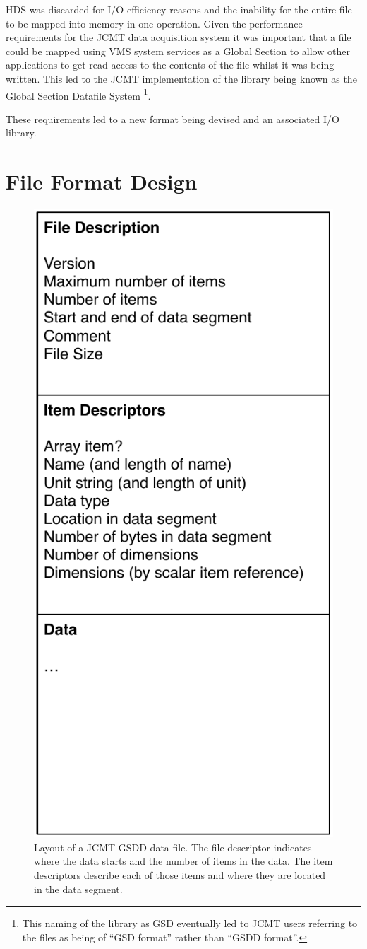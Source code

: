 \documentclass[final,authoryear,5p,times,twocolumn]{elsarticle}
\begin{document}
HDS was discarded for I/O efficiency reasons and the inability for the
entire file to be mapped into memory in one operation. Given the
performance requirements for the JCMT data acquisition system it was
important that a file could be mapped using VMS system services as a
Global Section to allow other applications to get read access to the
contents of the file whilst it was being written. This led to the JCMT
implementation of the library being known as the Global Section
Datafile System \citep[GSD;][]{mtin33}\footnote{This naming of the
  library as GSD eventually led to JCMT users referring to the files
  as being of ``GSD format'' rather than ``GSDD format''.}.

These requirements led to a new format being devised and an associated
I/O library.

\section{File Format Design}

\begin{figure}
\begin{center}
\includegraphics[width=0.5\columnwidth]{gsd-file-layout}
\end{center}
\caption{Layout of a JCMT GSDD data file. The file descriptor indicates
where the data starts and the number of items in the data. The item
descriptors describe each of those items and where they are located in
the data segment.}
\label{fig:jcmtgsd}
\end{figure}
\end{document}
